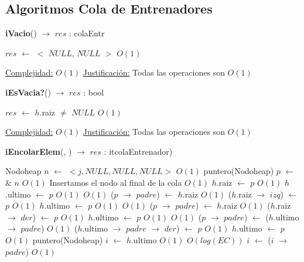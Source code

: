 \begin{Algoritmos}
 \subsection{Algoritmos Cola de Entrenadores}
\begin{algorithm}[H]{\textbf{iVacio}() $\to$ $res$ : colaEntr}
    	\begin{algorithmic}[1]
			 \State $res$ $\gets$  $<$ $NULL$, $NULL$ $>$ \Comment $O(1)$

			\medskip
			\Statex \underline{Complejidad:} $O(1)$
			\Statex \underline{Justificaci\'on:} Todas las operaciones son $O(1)$ 
    	\end{algorithmic}
\end{algorithm}
   
\begin{algorithm}[H]{\textbf{iEsVacia?}() $\to$ $res$ : bool}
    	\begin{algorithmic}[1]
			 \State $res$ $\gets$  $h$.raiz $\neq$ $NULL$ \Comment $O(1)$

			\medskip
			\Statex \underline{Complejidad:} $O(1)$
			\Statex \underline{Justificaci\'on:} Todas las operaciones son $O(1)$ 
    	\end{algorithmic}
\end{algorithm}

{\textbf{iEncolarElem}(, ) $\to$ $res$ : itcolaEntrenador)}
    	\begin{algorithmic}[1]
    	\State Nodoheap $n$ $\gets$ $<j, NULL, NULL, NULL>$ \Comment $O(1)$
    	\State puntero(Nodoheap) $p$ $\gets$ $\&$ $n$  \Comment $O(1)$
		 \Comment Insertamos el nodo al final de la cola $O(1)$
    		\State $h$.raiz $\gets$ $p$ \Comment $O(1)$
    		\State $h$.ultimo $\gets$ $p$ \Comment $O(1)$
    	\Else
    		 \Comment $O(1)$
    			\State ($p$ $\rightarrow$ $padre$) $\gets$ $h$.raiz \Comment $O(1)$
    			\State ($h$.raiz $\rightarrow$ $izq$) $\gets$ $p$ \Comment $O(1)$
    			\State $h$.ultimo $\gets$ $p$    \Comment $O(1)$
    		\Else
    			 \Comment $O(1)$
    				\State ($p$ $\rightarrow$ $padre$) $\gets$ $h$.raiz \Comment $O(1)$
    				\State ($h$.raiz $\rightarrow$ $der$) $\gets$ $p$ \Comment $O(1)$
    				\State $h$.ultimo $\gets$ $p$ \Comment $O(1)$
    			\Else
    				 \Comment $O(1)$
    					\State ($p$ $\rightarrow$ $padre$) $\gets$ ($h$.ultimo $\rightarrow$ $padre$) \Comment $O(1)$
    					\State ($h$.ultimo $\rightarrow$ $padre$ $\rightarrow$ $der$) $\gets$ $p$ \Comment $O(1)$
    					\State $h$.ultimo $\gets$ $p$ \Comment $O(1)$
    				\Else
						\State puntero(Nodoheap) $i$ $\gets$ $h$.ultimo	 \Comment $O(1)$	
    					 \Comment $O(log(EC))$
    						\State $i$ $\gets$ ($i$ $\rightarrow$ $padre$) \Comment $O(1)$
    					

\end{algorithmic}
\end{Algoritmos}
